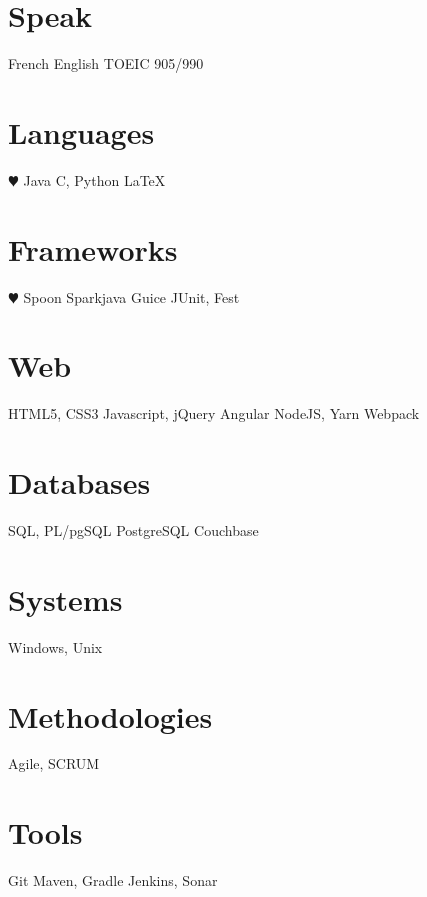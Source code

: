 \documentclass[hidelinks]{cv-style}          %
\begin{document}

\begin{aside}
\section{Speak}
French
English
TOEIC 905/990
%
\section{Languages}
{\color{red} $\varheartsuit$} Java
C, Python
\LaTeX{}
\section{Frameworks}
{\color{red} $\varheartsuit$} Spoon
Sparkjava
Guice
JUnit, Fest
\section{Web}
HTML5, CSS3
Javascript, jQuery
Angular
NodeJS, Yarn
Webpack
\section{Databases}
SQL, PL/pgSQL
PostgreSQL
Couchbase 
\section{Systems}
Windows, Unix	
\section{Methodologies}
Agile, SCRUM
\section{Tools}
Git
Maven, Gradle
Jenkins, Sonar
%
\end{aside}






\end{document}
